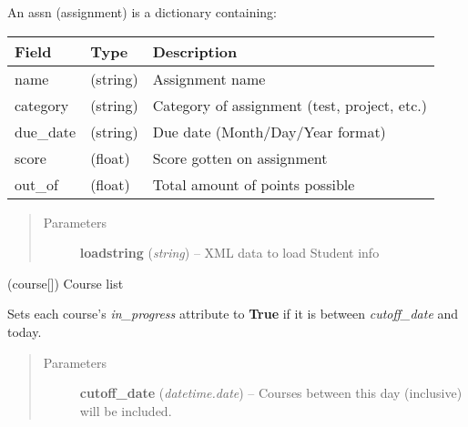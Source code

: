 \documentclass[letterpaper,10pt,english]{sphinxmanual}
\begin{document}
\begin{fulllineitems}
An assn (assignment) is a dictionary containing:

\begin{tabulary}{\linewidth}{|L|L|L|}
\hline
\textbf{\relax 
Field
} & \textbf{\relax 
Type
} & \textbf{\relax 
Description
}\\\hline

name
 & 
(string)
 & 
Assignment name
\\\hline

category
 & 
(string)
 & 
Category of assignment (test, project, etc.)
\\\hline

due\_date
 & 
(string)
 & 
Due date (Month/Day/Year format)
\\\hline

score
 & 
(float)
 & 
Score gotten on assignment
\\\hline

out\_of
 & 
(float)
 & 
Total amount of points possible
\\\hline
\end{tabulary}

\begin{quote}\begin{description}
\item[{Parameters}] \leavevmode
\textbf{loadstring} (\emph{string}) -- XML data to load Student info

\end{description}\end{quote}

\begin{fulllineitems}
\label{index:ps.Student.courses}
(course{[}{]}) Course list

\end{fulllineitems}


\begin{fulllineitems}
\label{index:ps.Student.filter_courses}
Sets each course's \emph{in\_progress} attribute to \textbf{True} if it is
between \emph{cutoff\_date} and today.
\begin{quote}\begin{description}
\item[{Parameters}] \leavevmode
\textbf{cutoff\_date} (\emph{datetime.date}) -- Courses between this day (inclusive) will be included.


\end{description}
\end{quote}
\end{fulllineitems}
\end{fulllineitems}
\end{document}
